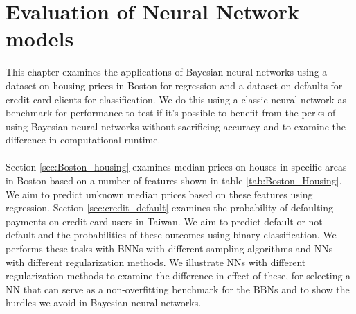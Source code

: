 \chapter{Evaluation of Neural Network models} \label{chap:eval_NN}
This chapter examines the applications of Bayesian neural networks using a dataset on housing prices in Boston for regression and a dataset on defaults for credit card clients for classification. We do this using a classic neural network as benchmark for performance to test if it's possible to benefit from the perks of using Bayesian neural networks without sacrificing accuracy and to examine the difference in computational runtime. \\
\\
Section \ref{sec:Boston_housing} examines median prices on houses in specific areas in Boston based on a number of features shown in table \ref{tab:Boston_Housing}. We aim to predict unknown median prices based on these features using regression. Section \ref{sec:credit_default} examines the probability of defaulting payments on credit card users in Taiwan. We aim to predict default or not default and the probabilities of these outcomes using binary classification. We performs these tasks with BNNs with different sampling algorithms and NNs with different regularization methods. We illustrate NNs with different regularization methods to examine the difference in effect of these, for selecting a NN that can serve as a non-overfitting benchmark for the BBNs and to show the hurdles we avoid in Bayesian neural networks. 

